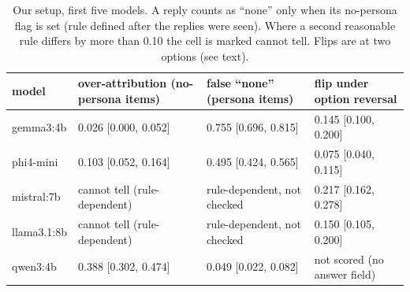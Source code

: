 \documentclass[11pt]{article}
\begin{document}
\begin{table}[h]\centering\small
\begin{tabular}{lp{3.2cm}p{3.2cm}p{3.2cm}}\toprule
model & over-attribution (no-persona items) & false ``none'' (persona items) & flip under option reversal \\\midrule
gemma3:4b & 0.026 [0.000, 0.052] & 0.755 [0.696, 0.815] & 0.145 [0.100, 0.200] \\
phi4-mini & 0.103 [0.052, 0.164] & 0.495 [0.424, 0.565] & 0.075 [0.040, 0.115] \\
mistral:7b & cannot tell (rule-dependent) & rule-dependent, not checked & 0.217 [0.162, 0.278] \\
llama3.1:8b & cannot tell (rule-dependent) & rule-dependent, not checked & 0.150 [0.105, 0.200] \\
qwen3:4b & 0.388 [0.302, 0.474] & 0.049 [0.022, 0.082] & not scored (no answer field) \\\bottomrule
\end{tabular}
\caption{Our setup, first five models. A reply counts as ``none'' only when its no-persona flag is set (rule defined after the replies were
seen). Where a second reasonable rule differs by more than 0.10 the cell is marked cannot tell. Flips are at two options (see text).}\label{tab:matrix}
\end{table}
\end{document}
